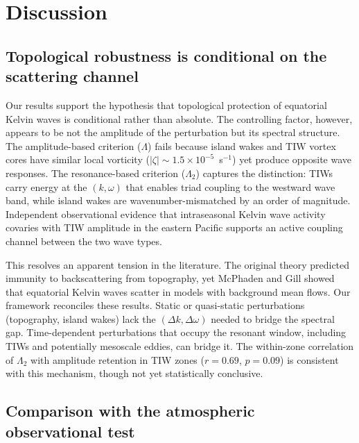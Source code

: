 \documentclass[11pt]{article}
\begin{document}
\section{Discussion}
\label{sec:discussion}

\subsection{Topological robustness is conditional on the scattering channel}

Our results support the hypothesis that topological protection of equatorial Kelvin waves\cite{Delplace2017} is conditional rather than absolute. The controlling factor, however, appears to be not the amplitude of the perturbation but its spectral structure. The amplitude-based criterion ($\Lambda$) fails because island wakes and TIW vortex cores have similar local vorticity ($|\zeta| \sim 1.5 \times 10^{-5}$~s$^{-1}$) yet produce opposite wave responses. The resonance-based criterion ($\Lambda_2$) captures the distinction: TIWs carry energy at the $(k, \omega)$ that enables triad coupling to the westward wave band\cite{Lyman2005}, while island wakes are wavenumber-mismatched by an order of magnitude. Independent observational evidence that intraseasonal Kelvin wave activity covaries with TIW amplitude in the eastern Pacific\cite{EscobarFranco2022} supports an active coupling channel between the two wave types.

This resolves an apparent tension in the literature. The original theory predicted immunity to backscattering from topography\cite{Delplace2017}, yet McPhaden and Gill showed that equatorial Kelvin waves scatter in models with background mean flows\cite{McPhaden1987}. Our framework reconciles these results. Static or quasi-static perturbations (topography, island wakes) lack the $(\Delta k, \Delta\omega)$ needed to bridge the spectral gap. Time-dependent perturbations that occupy the resonant window, including TIWs and potentially mesoscale eddies, can bridge it. The within-zone correlation of $\Lambda_2$ with amplitude retention in TIW zones ($r = 0.69$, $p = 0.09$) is consistent with this mechanism, though not yet statistically conclusive.

\subsection{Comparison with the atmospheric observational test}
\end{document}
